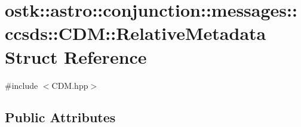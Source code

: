 \hypertarget{structostk_1_1astro_1_1conjunction_1_1messages_1_1ccsds_1_1_c_d_m_1_1_relative_metadata}{}\section{ostk\+:\+:astro\+:\+:conjunction\+:\+:messages\+:\+:ccsds\+:\+:C\+DM\+:\+:Relative\+Metadata Struct Reference}
\label{structostk_1_1astro_1_1conjunction_1_1messages_1_1ccsds_1_1_c_d_m_1_1_relative_metadata}


{\ttfamily \#include $<$C\+D\+M.\+hpp$>$}

\subsection*{Public Attributes}
